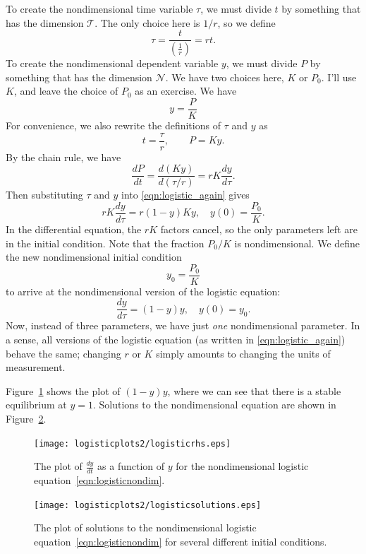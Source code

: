 To create the nondimensional time variable $\tau$, we must
divide $t$ by something that has the dimension $\mathcal{T}$.
The only choice here is $1/r$, so
we define
\begin{equation}
  \tau = \frac{t}{\left(\frac{1}{r}\right)} = rt.
\end{equation}
To create the nondimensional dependent variable $y$, we must
divide $P$ by something that has the dimension $\mathcal{N}$.
We have two choices here, $K$ or $P_0$.
I'll use $K$, and leave the choice of $P_0$ as an exercise.
We have
\begin{equation}
   y=\frac{P}{K}
\end{equation}
For convenience, we also rewrite the definitions of
$\tau$ and $y$ as
\begin{equation}
  t = \frac{\tau}{r}, \quad\quad P = Ky.
\end{equation}
By the chain rule, we have
\begin{equation}
  \frac{dP}{dt} = \frac{d(Ky)}{d(\tau/r)}
    = rK\frac{dy}{d\tau}.
  \label{eqn:chainrule}
\end{equation}
Then substituting $\tau$ and $y$ into
\eqref{eqn:logistic_again}
gives
\begin{equation}
  rK\frac{dy}{d\tau} = r (1-y)Ky,  \quad y(0) = \frac{P_0}{K}.
\end{equation}
In the differential equation, the $rK$ factors cancel, so the only
parameters left are in the initial condition.
Note that the fraction $P_0/K$ is nondimensional.
We define the new nondimensional initial condition
\begin{equation}
   y_0 = \frac{P_0}{K}
\end{equation}
to arrive at the nondimensional version of the logistic equation:
\begin{equation}
  \frac{dy}{d\tau} = (1-y)y, \quad  y(0) = y_0.
\label{eqn:logisticnondim}
\end{equation}
Now, instead of three parameters, we have just \emph{one}
nondimensional parameter.
In a sense, all versions of the logistic equation
(as written in \eqref{eqn:logistic_again})
behave the same; changing $r$ or $K$ simply amounts to
changing the units of measurement.

Figure~\ref{fig:logisticplot} shows the plot of $(1-y)y$, where we can see
that there is a stable equilibrium at $y=1$.
Solutions to the nondimensional equation are shown
in Figure~\ref{fig:logisticsolutionsplot}.
\begin{figure}
\centerline{%
\texttt{[image: logisticplots2/logisticrhs.eps]}
%
}
\caption{The plot of $\frac{dy}{dt}$ as a function of $y$
for the nondimensional logistic equation~\eqref{eqn:logisticnondim}.}
\label{fig:logisticplot}
\end{figure}
\begin{figure}
\centerline{%
\texttt{[image: logisticplots2/logisticsolutions.eps]}
%
}
\caption{The plot of solutions to the nondimensional
logistic equation~\eqref{eqn:logisticnondim} for several different
initial conditions.}
\label{fig:logisticsolutionsplot}
\end{figure}

